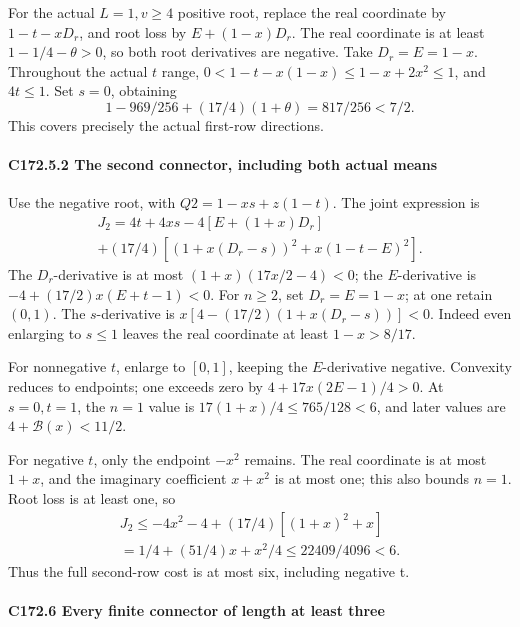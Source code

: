 For the actual \(L=1,\allowbreak \allowbreak  v\ge4\) positive root, replace the real coordinate by \(1-t-xD_r\), and root loss by \(E+(1-x)D_r\). The real coordinate is at least \(1-1/4-\theta>0\), so both root derivatives are negative. Take \(D_r=E=1-x\). Throughout the actual \(t\) range, \(0<1-t-x(1-x)\le1-x+2x^2\le1\), and \(4t\le1\). Set \(s=0\), obtaining
\[
1-969/256+(17/4)(1+\theta)=817/256<7/2.                 \tag{C172.T179.26}
\]
This covers precisely the actual first-row directions.

\paragraph{C172.5.2 The second connector, including both actual means}

Use the negative root, with \(Q2=1-xs+z(1-t).\) The joint expression is
\[
\begin{gathered}
J_2=4t+4xs-4[E+(1+x)D_r]\\
+(17/4)[(1+x(D_r-s))^2+x(1-t-E)^2].
\end{gathered}\tag{C172.T179.27}
\]
The \(D_r\)-derivative is at most \((1+x)(17x/2-4)<0\); the \(E\)-derivative is \(-4+(17/2)x(E+t-1)<0\). For \(n\ge2\), set \(D_r=E=1-x\); at one retain \((0,\allowbreak \allowbreak  1)\). The \(s\)-derivative is \(x[4-(17/2)(1+x(D_r-s))]<0\). Indeed even enlarging to \(s\le1\) leaves the real coordinate at least \(1-x>8/17\).

For nonnegative \(t\), enlarge to \([0,\allowbreak \allowbreak  1]\), keeping the \(E\)-derivative negative. Convexity reduces to endpoints; one exceeds zero by \(4+17x(2E-1)/4>0\). At \(s=0,\allowbreak \allowbreak  t=1\), the \(n=1\) value is \(17(1+x)/4\le765/128<6\), and later values are \(4+\mathcal B(x)<11/2\).

For negative \(t\), only the endpoint \(-x^2\) remains. The real coordinate is at most \(1+x\), and the imaginary coefficient \(x+x^2\) is at most one; this also bounds \(n=1\). Root loss is at least one, so
\[
\begin{gathered}
J_2\le-4x^2-4+(17/4)[(1+x)^2+x]\\
=1/4+(51/4)x+x^2/4\le22409/4096<6.
\end{gathered}\tag{C172.T179.28}
\]
Thus the full second-row cost is at most six, including negative t.

\paragraph{C172.6 Every finite connector of length at least three}

